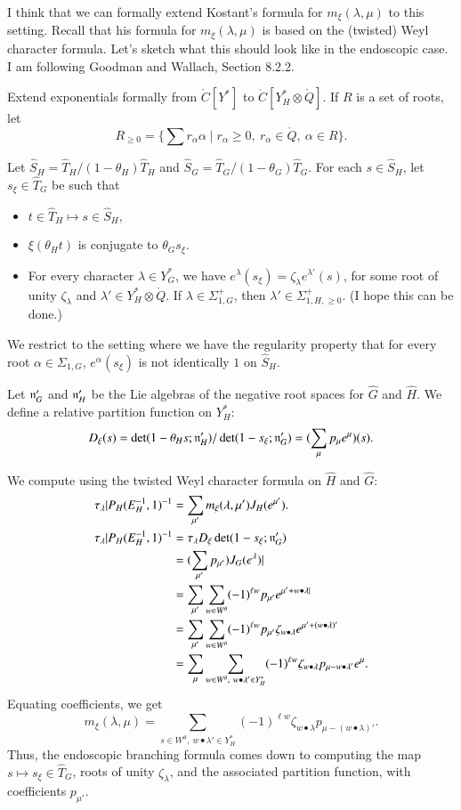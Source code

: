 I think that we can formally extend Kostant's formula for $m_\xi(\lambda,\mu)$ to this setting.
Recall that his formula for $m_\xi(\lambda,\mu)$ is based on the (twisted) Weyl character formula.
Let's sketch what this should look like in the endoscopic case.  I am following Goodman and Wallach,
Section 8.2.2.

Extend exponentials formally from $\ring{C}[Y^*]$ to $\ring{C}[Y^*_H\otimes \ring{Q}]$.
If $R$ is a set of roots, let 
\[
R_{\ge0} = \{\sum r_\alpha \alpha\mid r_\alpha\ge 0, ~ r_\alpha\in \ring{Q},~\alpha\in R \}.
\]

Let $\hat S_H = \hat T_H/(1-\theta_H)\hat T_H$ and $\hat S_G = \hat T_G/(1-\theta_G)\hat T_G$.
For each $s\in \hat S_H$, let $s_\xi\in \hat T_G$ be such that
\begin{itemize}
\item $t\in\hat T_H \mapsto s\in \hat S_H,$
\item $\xi(\theta_H t)$ is conjugate to $\theta_G s_\xi$.
\item For every character $\lambda\in Y^*_G$, we have $e^\lambda(s_\xi) = \zeta_\lambda e^{\lambda'}(s)$, 
for some root of unity $\zeta_\lambda$ and $\lambda'\in Y^*_H\otimes \ring{Q}$.  
If $\lambda\in \Sigma_{1,G}^+$, then $\lambda'\in \Sigma_{1,H,\ge0}^+$.
(I hope this can be done.)
\end{itemize}
We restrict to the setting where we have the regularity property that 
for every root $\alpha\in \Sigma_{1,G}$, $e^\alpha(s_\xi)$ is not identically $1$ on $\hat S_H$.

Let ${\mathfrak n}'_G$ and ${\mathfrak n}'_H$ be the Lie algebras of the negative root spaces for $\hat G$ and $\hat H$.
We define a relative partition function on $Y^*_H$:
\[
D_{\xi}(s) = \det(1-\theta_H s;{\mathfrak n}'_H)/\det(1-  s_\xi;{\mathfrak n}'_G) = (\sum_{\mu} p_\mu e^\mu)(s).
\]

We compute using the twisted Weyl character formula on $\hat H$ and $\hat G$:
\begin{align*}
\tau_\lambda| P_H(E_H^{-1},1)^{-1} &= \sum_{\mu'} m_\xi(\lambda,{\mu'}) J_H(e^{\mu'}).\\
\tau_\lambda| P_H(E_H^{-1},1)^{-1} &= \tau_\lambda D_{\xi} \det(1- s_\xi;{\mathfrak n}'_G)\\
  &= (\sum_{\mu'} p_{\mu'}) J_G(e^\lambda)|\\
  &= \sum_{\mu'} \sum_{w\in W^\theta} (-1)^{\ell w} p_{\mu'} e^{\mu'+w\bullet \lambda|}\\
  &= \sum_{\mu'} \sum_{w\in W^\theta} (-1)^{\ell w} p_{\mu'} \zeta_{w\bullet\lambda} e^{\mu'+(w\bullet \lambda)'}\\
  &= \sum_\mu \sum_{w\in W^\theta,~{w\bullet\lambda}'\in Y^*_H} (-1)^{\ell w} \zeta_{w\bullet\lambda} p_{\mu - {w\bullet \lambda}'} e^\mu.
\end{align*}
Equating coefficients, we get
\begin{equation}
m_\xi(\lambda,\mu) = \sum_{s\in W^\theta, ~{w\bullet\lambda}'\in  Y^*_H} (-1)^{\ell w} \zeta_{w\bullet\lambda} 
p_{\mu-(w\bullet\lambda)'}.
\end{equation}
Thus, the endoscopic branching formula comes down to computing the map $s\mapsto s_\xi\in \hat T_G$,
roots of unity $\zeta_\lambda$,
and the associated partition function, with coefficients $p_{\mu'}$.


